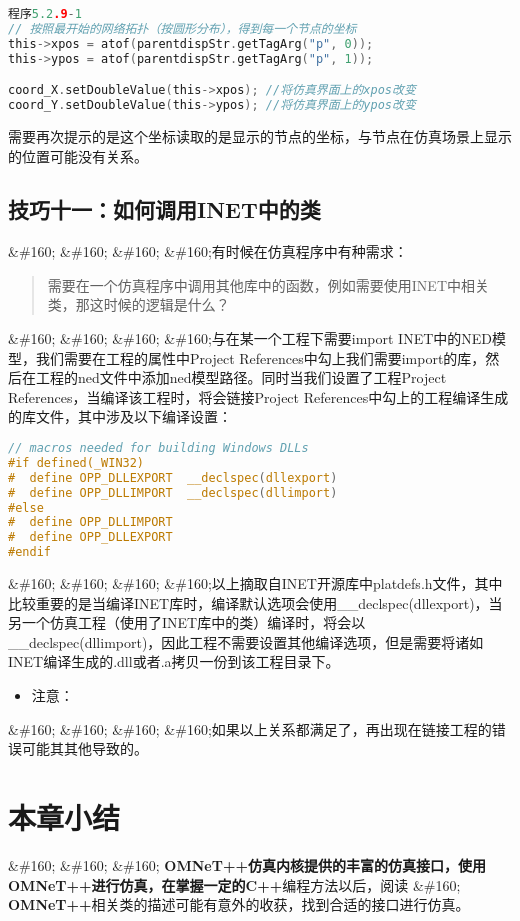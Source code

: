 \begin{lstlisting}[language=c]
程序5.2.9-1
// 按照最开始的网络拓扑（按圆形分布），得到每一个节点的坐标
this->xpos = atof(parentdispStr.getTagArg("p", 0));
this->ypos = atof(parentdispStr.getTagArg("p", 1));

coord_X.setDoubleValue(this->xpos); //将仿真界面上的xpos改变
coord_Y.setDoubleValue(this->ypos); //将仿真界面上的ypos改变

\end{lstlisting}

需要再次提示的是这个坐标读取的是显示的节点的坐标，与节点在仿真场景上显示的位置可能没有关系。

\subsection{技巧十一：如何调用INET中的类}
\label{技巧十一：如何调用inet中的类}

\&\#160; \&\#160; \&\#160; \&\#160;有时候在仿真程序中有种需求：

\begin{quote}
需要在一个仿真程序中调用其他库中的函数，例如需要使用INET中相关类，那这时候的逻辑是什么？
\end{quote}

\&\#160; \&\#160; \&\#160; \&\#160;与在某一个工程下需要import INET中的NED模型，我们需要在工程的属性中Project References中勾上我们需要import的库，然后在工程的ned文件中添加ned模型路径。同时当我们设置了工程Project References，当编译该工程时，将会链接Project References中勾上的工程编译生成的库文件，其中涉及以下编译设置：

\begin{lstlisting}[language=c]
// macros needed for building Windows DLLs
#if defined(_WIN32)
#  define OPP_DLLEXPORT  __declspec(dllexport)
#  define OPP_DLLIMPORT  __declspec(dllimport)
#else
#  define OPP_DLLIMPORT
#  define OPP_DLLEXPORT
#endif
\end{lstlisting}

\&\#160; \&\#160; \&\#160; \&\#160;以上摘取自INET开源库中platdefs.h文件，其中比较重要的是当编译INET库时，编译默认选项会使用\_\_declspec(dllexport)，当另一个仿真工程（使用了INET库中的类）编译时，将会以\_\_declspec(dllimport)，因此工程不需要设置其他编译选项，但是需要将诸如INET编译生成的.dll或者.a拷贝一份到该工程目录下。

\begin{itemize}
\item 注意：

\end{itemize}

\&\#160; \&\#160; \&\#160; \&\#160;如果以上关系都满足了，再出现在链接工程的错误可能其其他导致的。

\section{本章小结}
\label{本章小结}

\&\#160; \&\#160; \&\#160; \textbf{OMNeT++\textbf{仿真内核提供的丰富的仿真接口，使用}OMNeT++\textbf{进行仿真，在掌握一定的}C++}编程方法以后，阅读 \&\#160; \textbf{OMNeT++}相关类的描述可能有意外的收获，找到合适的接口进行仿真。
